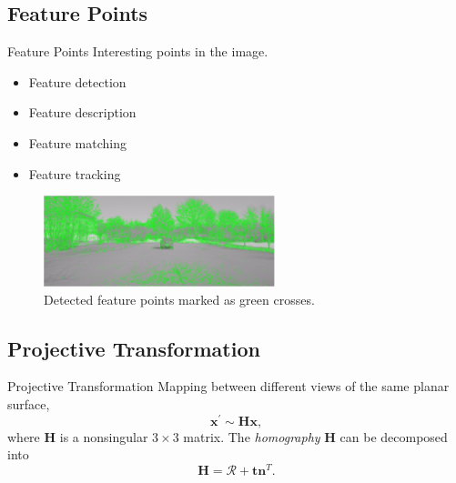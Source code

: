 \documentclass{beamer}
\renewcommand{\H}{\bm{H}}
\newcommand{\rotmat}{\bm{\mathcal{R}}}
\begin{document}
\subsection{Feature Points}

\begin{frame}{Feature Points}
	Interesting points in the image.
	\begin{itemize}
		\item Feature detection
		\item Feature description
		\item Feature matching
		\item Feature tracking
	\end{itemize}
	\vfill
	\begin{figure}
		\centering
		\includegraphics[width=0.6\textwidth]{harris_features}
		\caption{\label{fig:featurepointexample} Detected feature points marked as green crosses.}
	\end{figure}
\end{frame}

\subsection{Projective Transformation}

\begin{frame}{Projective Transformation}
	Mapping between different views of the same planar surface,
	\begin{equation*}
		\bm{x}^\prime \sim \H \bm{x},
	\end{equation*}
	where $\H$ is a nonsingular $3 \times 3$ matrix.
	\vspace{1em}
	The \textit{homography} $\H$ can be decomposed into
	\begin{equation*}
		\H = \rotmat + \bm{t} \bm{n}^T.
	\end{equation*}
\end{frame}
\end{document}
